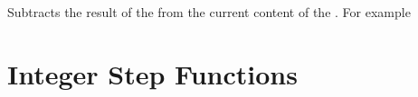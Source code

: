 \documentclass[oneside]{book}
\begin{document}
\begin{function}{\IntSub}
\begin{syntax}
  
\end{syntax}
Subtracts the result of the  from the
current content of the . For example
\begin{demohigh}
\IntSet {}
\IntSub {}
\IntUse \lTmpaInt
\end{demohigh}
\end{function}

\section{Integer Step Functions}

\end{document}
